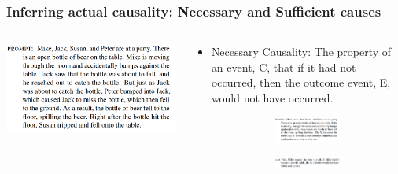 \documentclass{beamer}
\begin{document}
\begin{frame}
	\frametitle{Inferring actual causality: Necessary and Sufficient causes}
	\begin{columns}
		\begin{column}{0.5 \textwidth}
			\centering
			\includegraphics[scale=0.4]{imgs/necessary_prompt.png}
		\end{column}
		\begin{column}{0.5 \textwidth}
			\begin{itemize}
				\item Necessary Causality: The property of an event, C, that if it had not occurred, then the outcome event, E, would not
					have occurred.
					\begin{figure}
						\begin{subfigure}{0.5 \textwidth}
							\centering
							\includegraphics[scale=0.4]{imgs/necessary_prompt_1.png}
						\end{subfigure}
						\begin{subfigure}{0.5 \textwidth}
							\centering
							\includegraphics[scale=0.4]{imgs/necessary_prompt_llm.png}
						\end{subfigure}

\end{figure}
\end{itemize}
\end{column}
\end{columns}
\end{frame}
\end{document}
